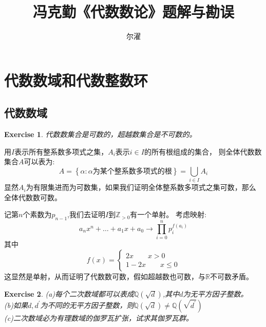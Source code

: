\documentclass[12pt, a4paper]{ctexart}
\title{冯克勤《代数数论》题解与勘误}
\author{尔濯}
\date{}
\newenvironment{prooff}{{\noindent\it\textcolor{cyan!40!black}{Proof}:}\quad}{\par}
\newcommand{\bbrace}[1]{\left\{ #1 \right\} }
\newcommand{\bb}[1]{$\mathbb{#1}$}
\newcommand{\p}{^{\prime}}
\newcounter{exercise}
\renewcommand{\theexercise}{\text{习题\,}\stepcounter{exercise}\arabic{exercise}}
\newtheorem{exer}{Exercise}[subsection]
\begin{document}
\thispagestyle{empty}
\maketitle

\tableofcontents
\newpage
\section{代数数域和代数整数环}
\subsection{代数数域}

\begin{exer}
    代数数集合是可数的，超越数集合是不可数的。
\end{exer}
\begin{prooff}
    用$I$表示所有整系数多项式之集，$A_i$表示$i\in I$的所有根组成的集合，
    则全体代数数集合$A$可以表为:
    \begin{equation*}
        A=\bbrace{\alpha:\alpha \text{为某个整系数多项式的根}}=\bigcup_{i\in I}A_i
    \end{equation*}
    显然$A_i$为有限集进而为可数集，如果我们证明全体整系数多项式之集可数，那么全体代数数可数。


    记第$n$个素数为$p_{n-1}$,我们去证明$I$到$\mathbb{Z}_{>0}$有一个单射。
    考虑映射:\begin{equation*}
        a_nx^n+\dots+a_1x+a_0 \rightarrow \prod_{i=0}^{n}p_i^{f(a_i)}
    \end{equation*}
    其中
    \begin{equation*}
        f(x)=\begin{cases}
            2x \qquad x>0 \\
            1-2x\qquad x\le 0
        \end{cases}
    \end{equation*}
    这显然是单射，从而证明了代数数可数，假如超越数也可数，与\bb{R}不可数矛盾。
\end{prooff}
\begin{exer}
    (a)每个二次数域都可以表成$\mathbb{Q}(\sqrt{d})$,其中$d$为无平方因子整数。\\
    (b)如果$d,d\p$为不同的无平方因子整数，则$\mathbb{Q}(\sqrt{d})\neq\mathbb{Q}(\sqrt{d\p})$\\
    (c)二次数域必为有理数域的伽罗瓦扩张，试求其伽罗瓦群。\\
\end{exer}
\end{document}
